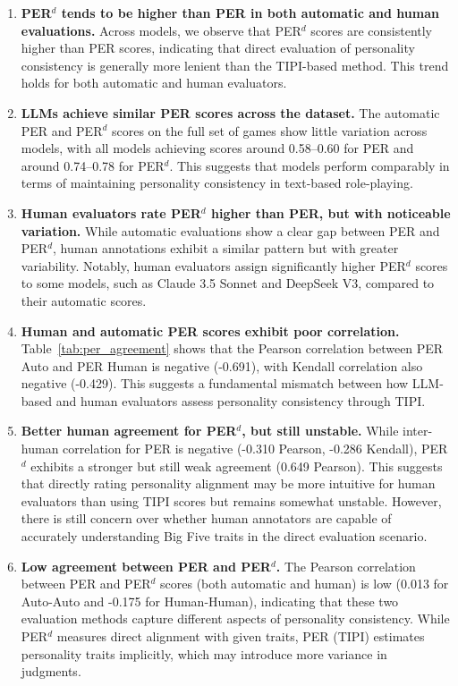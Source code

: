\begin{enumerate}
    \item \textbf{PER$^d$ tends to be higher than PER in both automatic and human evaluations.} Across models, we observe that PER$^d$ scores are consistently higher than PER scores, indicating that direct evaluation of personality consistency is generally more lenient than the TIPI-based method. This trend holds for both automatic and human evaluators.

    \item \textbf{LLMs achieve similar PER scores across the dataset.} The automatic PER and PER$^d$ scores on the full set of games show little variation across models, with all models achieving scores around 0.58–0.60 for PER and around 0.74–0.78 for PER$^d$. This suggests that models perform comparably in terms of maintaining personality consistency in text-based role-playing.

    \item \textbf{Human evaluators rate PER$^d$ higher than PER, but with noticeable variation.} While automatic evaluations show a clear gap between PER and PER$^d$, human annotations exhibit a similar pattern but with greater variability. Notably, human evaluators assign significantly higher PER$^d$ scores to some models, such as Claude 3.5 Sonnet and DeepSeek V3, compared to their automatic scores.

    \item \textbf{Human and automatic PER scores exhibit poor correlation.} Table~\ref{tab:per_agreement} shows that the Pearson correlation between PER Auto and PER Human is negative (-0.691), with Kendall correlation also negative (-0.429). This suggests a fundamental mismatch between how LLM-based and human evaluators assess personality consistency through TIPI.

    \item \textbf{Better human agreement for PER$^d$, but still unstable.} While inter-human correlation for PER is negative (-0.310 Pearson, -0.286 Kendall), PER$^d$ exhibits a stronger but still weak agreement (0.649 Pearson). This suggests that directly rating personality alignment may be more intuitive for human evaluators than using TIPI scores but remains somewhat unstable. However, there is still concern over whether human annotators are capable of accurately understanding Big Five traits in the direct evaluation scenario.

    \item \textbf{Low agreement between PER and PER$^d$.} The Pearson correlation between PER and PER$^d$ scores (both automatic and human) is low (0.013 for Auto-Auto and -0.175 for Human-Human), indicating that these two evaluation methods capture different aspects of personality consistency. While PER$^d$ measures direct alignment with given traits, PER (TIPI) estimates personality traits implicitly, which may introduce more variance in judgments.
\end{enumerate}

